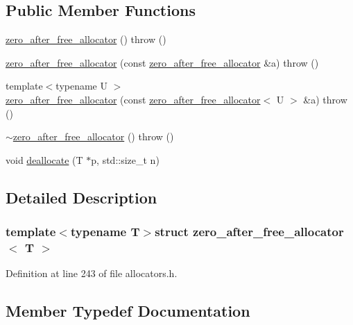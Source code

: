 \subsection*{Public Member Functions}
\begin{DoxyCompactItemize}
\item 
\hyperlink{structzero__after__free__allocator_a2206a4e5d2d3a0cd27d2baa50482f4a8}{zero\+\_\+after\+\_\+free\+\_\+allocator} ()  throw ()
\item 
\hyperlink{structzero__after__free__allocator_a2822b64128f40c3b54ed6dbbf258730b}{zero\+\_\+after\+\_\+free\+\_\+allocator} (const \hyperlink{structzero__after__free__allocator}{zero\+\_\+after\+\_\+free\+\_\+allocator} \&a)  throw ()
\item 
{\footnotesize template$<$typename U $>$ }\\\hyperlink{structzero__after__free__allocator_a9d83915e027c0be7b08d6e5e8e4424ba}{zero\+\_\+after\+\_\+free\+\_\+allocator} (const \hyperlink{structzero__after__free__allocator}{zero\+\_\+after\+\_\+free\+\_\+allocator}$<$ U $>$ \&a)  throw ()
\item 
\hyperlink{structzero__after__free__allocator_a82507a202c01cdce566875872bde9493}{$\sim$zero\+\_\+after\+\_\+free\+\_\+allocator} ()  throw ()
\item 
void \hyperlink{structzero__after__free__allocator_a63a1610931a9656c9373bf5dce2db796}{deallocate} (T $\ast$p, std\+::size\+\_\+t n)
\end{DoxyCompactItemize}


\subsection{Detailed Description}
\subsubsection*{template$<$typename T$>$struct zero\+\_\+after\+\_\+free\+\_\+allocator$<$ T $>$}



Definition at line 243 of file allocators.\+h.



\subsection{Member Typedef Documentation}
\hypertarget{structzero__after__free__allocator_aab907d58a45f5bf4baeaefb373f00987}{}

